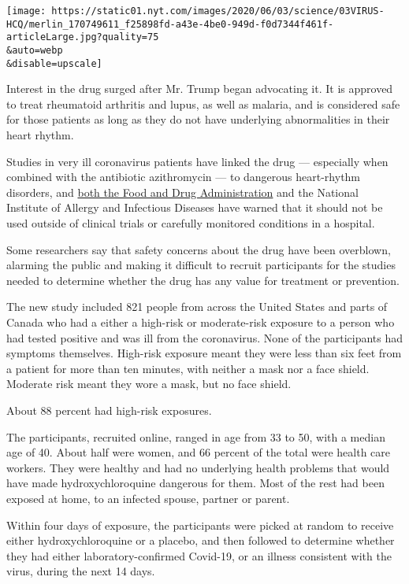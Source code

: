 \texttt{[image: https://static01.nyt.com/images/2020/06/03/science/03VIRUS-HCQ/merlin\_170749611\_f25898fd-a43e-4be0-949d-f0d7344f461f-articleLarge.jpg?quality=75\\\&auto=webp\\\&disable=upscale]}

Interest in the drug surged after Mr. Trump began advocating it. It is
approved to treat rheumatoid arthritis and lupus, as well as malaria,
and is considered safe for those patients as long as they do not have
underlying abnormalities in their heart rhythm.

Studies in very ill coronavirus patients have linked the drug ---
especially when combined with the antibiotic azithromycin --- to
dangerous heart-rhythm disorders, and
\href{https://www.nytimes.com/2020/04/24/health/fda-hydroxychloroquine-coronavirus.html}{both
the Food and Drug Administration} and the National Institute of Allergy
and Infectious Diseases have warned that it should not be used outside
of clinical trials or carefully monitored conditions in a hospital.

Some researchers say that safety concerns about the drug have been
overblown, alarming the public and making it difficult to recruit
participants for the studies needed to determine whether the drug has
any value for treatment or prevention.

The new study included 821 people from across the United States and
parts of Canada who had a either a high-risk or moderate-risk exposure
to a person who had tested positive and was ill from the coronavirus.
None of the participants had symptoms themselves. High-risk exposure
meant they were less than six feet from a patient for more than ten
minutes, with neither a mask nor a face shield. Moderate risk meant they
wore a mask, but no face shield.

About 88 percent had high-risk exposures.

The participants, recruited online, ranged in age from 33 to 50, with a
median age of 40. About half were women, and 66 percent of the total
were health care workers. They were healthy and had no underlying health
problems that would have made hydroxychloroquine dangerous for them.
Most of the rest had been exposed at home, to an infected spouse,
partner or parent.

Within four days of exposure, the participants were picked at random to
receive either hydroxychloroquine or a placebo, and then followed to
determine whether they had either laboratory-confirmed Covid-19, or an
illness consistent with the virus, during the next 14 days.

